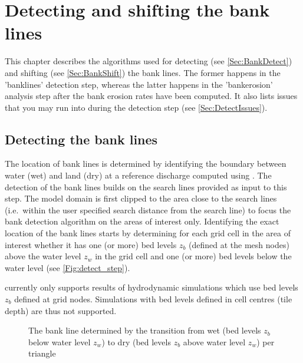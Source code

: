 \chapter{Detecting and shifting the bank lines} \label{Chp:BankDetect}

This chapter describes the algorithms used for detecting (see \autoref{Sec:BankDetect}) and shifting (see \autoref{Sec:BankShift}) the bank lines.
The former happens in the 'banklines' detection step, whereas the latter happens in the 'bankerosion' analysis step after the bank erosion rates have been computed.
It also lists issues that you may run into during the detection step (see \autoref{Sec:DetectIssues}).

\section{Detecting the bank lines} \label{Sec:BankDetect}

The location of bank lines is determined by identifying the boundary between water (wet) and land (dry) at a reference discharge computed using \dflowfm.
The detection of the bank lines builds on the search lines provided as input to this step.
The model domain is first clipped to the area close to the search lines (i.e.~within the user specified search distance from the search line) to focus the bank detection algorithm on the areas of interest only.
Identifying the exact location of the bank lines starts by determining for each grid cell in the area of interest whether it has one (or more) bed levels $z_b$ (defined at the mesh nodes) above the water level $z_w$ in the grid cell and one (or more) bed levels below the water level (see \autoref{Fig:detect_step}).

\Note \dfastbe currently only supports results of hydrodynamic simulations which use bed levels $z_b$ defined at grid nodes.
Simulations with bed levels defined in cell centres (tile depth) are thus not supported.

\begin{figure}[!h]
\center
\resizebox{5cm}{!}{
   
}
\caption{The bank line determined by the transition from wet (bed levels $z_b$ below water level $z_w$) to dry (bed levels $z_b$ above water level $z_w$) per triangle}
\label{Fig:detect_step}
\end{figure}

